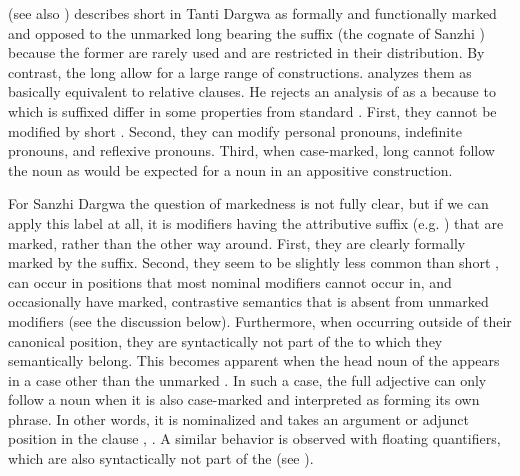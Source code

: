 \citet{Lander2014} (see also ) describes short  in Tanti Dargwa as formally and functionally marked and opposed to the unmarked long  bearing the suffix  (the cognate of Sanzhi ) because the former are rarely used and are restricted in their distribution. By contrast, the long  allow for a large range of constructions. \citet{Lander2014} analyzes them as basically equivalent to relative clauses. He rejects an analysis of  as a  because  to which  is suffixed differ in some properties from standard . First, they cannot be modified by short . Second, they can modify personal pronouns, indefinite pronouns, and reflexive pronouns. Third, when case-marked, long  cannot follow the noun as would be expected for a noun in an appositive construction.

For Sanzhi Dargwa the question of markedness is not fully clear, but if we can apply this label at all, it is modifiers having the attributive suffix (e.g. ) that are marked, rather than the other way around. First, they are clearly formally marked by the suffix. Second, they seem to be slightly less common than short , can occur in positions that most nominal modifiers cannot occur in, and occasionally have marked, contrastive semantics that is absent from unmarked modifiers (see the discussion below). Furthermore, when occurring outside of their canonical position, they are syntactically not part of the  to which they semantically belong. This becomes apparent when the head noun of the  appears in a case other than the unmarked . In such a case, the full adjective can only follow a noun when it is also case-marked and interpreted as forming its own phrase. In other words, it is nominalized and takes an argument or adjunct position in the clause , . A similar behavior is observed with floating quantifiers, which are also syntactically not part of the  (see ).

